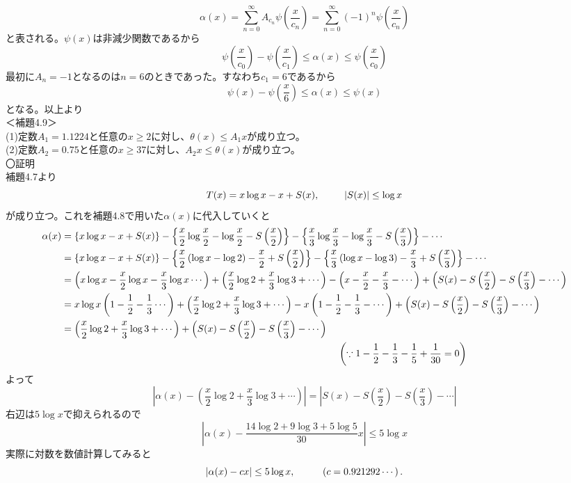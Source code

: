 \documentclass{jsarticle}
\begin{document}
\[\alpha(x)=\sum_{n=0}^{\infty}A_{c_{n}}\psi\left(\frac{x}{c_{n}}\right)=\sum_{n=0}^{\infty}(-1)^{n}\psi\left(\frac{x}{c_{n}}\right)\]
と表される。\(\psi(x)\)は非減少関数であるから
\[\psi\left(\frac{x}{c_{0}}\right)-\psi\left(\frac{x}{c_{1}}\right)\leq\alpha(x)\leq\psi\left(\frac{x}{c_{0}}\right)\]
最初に\(A_{n}=-1\)となるのは\(n=6\)のときであった。すなわち\(c_{1}=6\)であるから
\[\psi(x)-\psi\left(\frac{x}{6}\right)\leq\alpha(x)\leq\psi(x)\]
となる。以上より\\
＜補題4.9＞\\
(1)\hspace{2mm}定数\(A_{1}=1.1224\)と任意の\(x\geq2\)に対し、\(\theta(x)\leq A_{1}x\)が成り立つ。\\
(2)\hspace{2mm}定数\(A_{2}=0.75\)と任意の\(x\geq37\)に対し、\(A_{2}x\leq\theta(x)\)が成り立つ。\\
〇証明\\
補題4.7より
\[T(x)=x\log x-x+S(x),\hspace{9mm}|S(x)|\leq\log x\]
が成り立つ。これを補題4.8で用いた\(\alpha(x)\)に代入していくと
\begin{align*}
\alpha(x)&=\left\{x\log x-x+S(x)\right\}-\left\{\frac{x}{2}\log\frac{x}{2}-\log\frac{x}{2}-S\left(\frac{x}{2}\right)\right\}-\left\{\frac{x}{3}\log\frac{x}{3}-\log\frac{x}{3}-S\left(\frac{x}{3}\right)\right\}-\cdots\\
&=\left\{x\log x-x+S(x)\right\}-\left\{\frac{x}{2}\left(\log x-\log2\right)-\frac{x}{2}+S\left(\frac{x}{2}\right)\right\}-\left\{\frac{x}{3}\left(\log x-\log3\right)-\frac{x}{3}+S\left(\frac{x}{3}\right)\right\}-\cdots\\
&=\left(x\log x-\frac{x}{2}\log x-\frac{x}{3}\log x\cdots\right)+\left(\frac{x}{2}\log2+\frac{x}{3}\log3+\cdots\right)-\left(x-\frac{x}{2}-\frac{x}{3}-\cdots\right)+\left(S(x)-S\left(\frac{x}{2}\right)-S\left(\frac{x}{3}\right)-\cdots\right)\\
&=x\log x\left(1-\frac{1}{2}-\frac{1}{3}\cdots\right)+\left(\frac{x}{2}\log2+\frac{x}{3}\log3+\cdots\right)-x\left(1-\frac{1}{2}-\frac{1}{3}-\cdots\right)+\left(S(x)-S\left(\frac{x}{2}\right)-S\left(\frac{x}{3}\right)-\cdots\right)\\
&=\left(\frac{x}{2}\log2+\frac{x}{3}\log3+\cdots\right)+\left(S(x)-S\left(\frac{x}{2}\right)-S\left(\frac{x}{3}\right)-\cdots\right)\\
&\hspace{100mm}\left(\because1-\frac{1}{2}-\frac{1}{3}-\frac{1}{5}+\frac{1}{30}=0\right)
\end{align*}
よって
\[\left|\alpha(x)-\left(\frac{x}{2}\log2+\frac{x}{3}\log3+\cdots\right)\right|=\left|S(x)-S\left(\frac{x}{2}\right)-S\left(\frac{x}{3}\right)-\cdots\right|\]
右辺は\(5\log x\)で抑えられるので
\[\left|\alpha(x)-\frac{14\log2+9\log3+5\log5}{30}x\right|\leq5\log x\]
実際に対数を数値計算してみると
\[\left|\alpha(x)-cx\right|\leq5\log x,\hspace{10mm}\left(c=0.921292\cdots\right).\]
\end{document}
